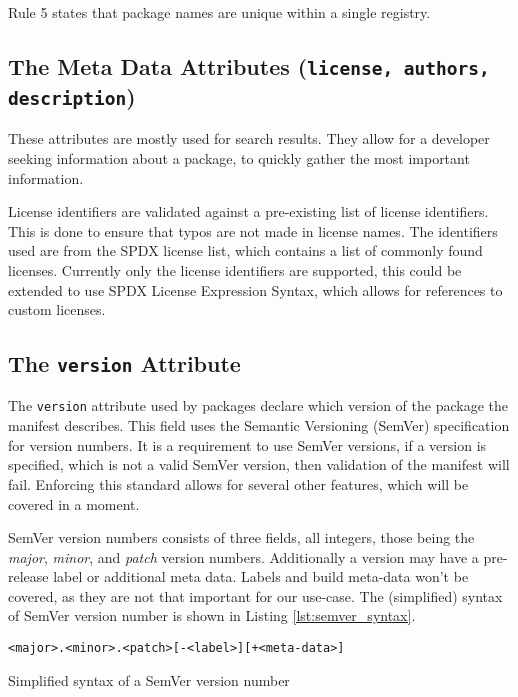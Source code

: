Rule 5 states that package names are unique within a single registry.

\subsection{The Meta Data Attributes ({\tt license, authors, description})}

These attributes are mostly used for search results. They allow for a developer
seeking information about a package, to quickly gather the most important
information.

License identifiers are validated against a pre-existing list of license
identifiers. This is done to ensure that typos are not made in license names.
The identifiers used are from the SPDX license list\autocite{SPDX}, which
contains a list of commonly found licenses. Currently only the license
identifiers are supported, this could be extended to use SPDX License
Expression Syntax, which allows for references to custom licenses.

\subsection{The {\tt version} Attribute}
\label{sec:versions}


The \texttt{version} attribute used by packages declare which version
of the package the manifest describes. This field uses the Semantic Versioning
(SemVer)\autocite{SEMV} specification for version numbers. It is a requirement
to use SemVer versions, if a version is specified, which is not a valid SemVer
version, then validation of the manifest will fail. Enforcing this standard
allows for several other features, which will be covered in a moment.

SemVer version numbers consists of three fields, all integers, those being the
\emph{major}, \emph{minor}, and \emph{patch} version numbers. Additionally a
version may have a pre-release label or additional meta data. Labels and build
meta-data won't be covered, as they are not that important for our use-case.
The (simplified) syntax of SemVer version number is shown in Listing
\ref{lst:semver_syntax}.

\begin{listing}[H]
\begin{verbatim}
<major>.<minor>.<patch>[-<label>][+<meta-data>]
\end{verbatim}
\caption{Simplified syntax of a SemVer version number}
\label{lst:semver_syntax}
\end{listing}

